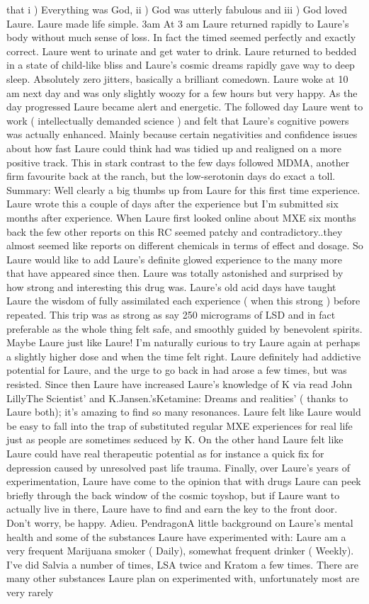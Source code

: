\documentclass[12pt]{book}
\begin{document}
that i ) Everything was God, ii ) God was utterly fabulous and iii ) God loved Laure. Laure made life simple. 3am At 3 am Laure returned rapidly to Laure's body without much sense of loss. In fact the timed seemed perfectly and exactly correct. Laure went to urinate and get water to drink. Laure returned to bedded in a state of child-like bliss and Laure's cosmic dreams rapidly gave way to deep sleep. Absolutely zero jitters, basically a brilliant comedown. Laure woke at 10 am next day and was only slightly woozy for a few hours but very happy. As the day progressed Laure became alert and energetic. The followed day Laure went to work ( intellectually demanded science ) and felt that Laure's cognitive powers was actually enhanced. Mainly because certain negativities and confidence issues about how fast Laure could think had was tidied up and realigned on a more positive track. This in stark contrast to the few days followed MDMA, another firm favourite back at the ranch, but the low-serotonin days do exact a toll. Summary: Well clearly a big thumbs up from Laure for this first time experience. Laure wrote this a couple of days after the experience but I'm submitted six months after experience. When Laure first looked online about MXE six months back the few other reports on this RC seemed patchy and contradictory..they almost seemed like reports on different chemicals in terms of effect and dosage. So Laure would like to add Laure's definite glowed experience to the many more that have appeared since then. Laure was totally astonished and surprised by how strong and interesting this drug was. Laure's old acid days have taught Laure the wisdom of fully assimilated each experience ( when this strong ) before repeated. This trip was as strong as say 250 micrograms of LSD and in fact preferable as the whole thing felt safe, and smoothly guided by benevolent spirits. Maybe Laure just like Laure! I'm naturally curious to try Laure again at perhaps a slightly higher dose and when the time felt right. Laure definitely had addictive potential for Laure, and the urge to go back in had arose a few times, but was resisted. Since then Laure have increased Laure's knowledge of K via read John LillyThe Scientist' and K.Jansen.'sKetamine: Dreams and realities' ( thanks to Laure both); it's amazing to find so many resonances. Laure felt like Laure would be easy to fall into the trap of substituted regular MXE experiences for real life just as people are sometimes seduced by K. On the other hand Laure felt like Laure could have real therapeutic potential as for instance a quick fix for depression caused by unresolved past life trauma. Finally, over Laure's years of experimentation, Laure have come to the opinion that with drugs Laure can peek briefly through the back window of the cosmic toyshop, but if Laure want to actually live in there, Laure have to find and earn the key to the front door. Don't worry, be happy. Adieu. PendragonA little background on Laure's mental health and some of the substances Laure have experimented with: Laure am a very frequent Marijuana smoker ( Daily), somewhat frequent drinker ( Weekly). I've did Salvia a number of times, LSA twice and Kratom a few times. There are many other substances Laure plan on experimented with, unfortunately most are very rarely 
\end{document}
